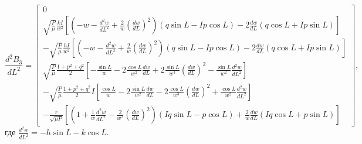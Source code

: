 \begin{equation*}
\frac{d^2 B_3}{dL^2} =
    \begin{bmatrix}
        0 \\
        \sqrt{\frac{P}{\mu}} \frac{kI}{w^2} \left[ \left( -w - \frac{d^2 w}{dL^2} +
        \frac{2}{w} \left( \frac{dw}{dL} \right)^2 \right) (q \sin L - I p \cos L) -
        2 \frac{dw}{dL} (q \cos L + Ip \sin L) \right] \\
        -\sqrt{\frac{P}{\mu}} \frac{hI}{w^2} \left[ \left( -w - \frac{d^2 w}{dL^2} +
        \frac{2}{w} \left( \frac{dw}{dL} \right)^2 \right) (q \sin L - I p \cos L) -
        2 \frac{dw}{dL} (q \cos L + Ip \sin L) \right] \\
        \sqrt{\frac{P}{\mu}} \frac{1 + p^2 + q^2}{2} \left[ -\frac{\sin L}{w} - 2 \frac{\cos L}{w^2} \frac{dw}{dL} +
        2 \frac{\sin L}{w^3} \left( \frac{dw}{dL} \right)^2 - \frac{\sin L}{w^2} \frac{d^2 w}{dL^2} \right] \\
        -\sqrt{\frac{P}{\mu}} \frac{1 + p^2 + q^2}{2} I \left[ \frac{\cos L}{w} - 2 \frac{\sin L}{w^2} \frac{dw}{dL} -
        2 \frac{\cos L}{w^3} \left( \frac{dw}{dL} \right)^2 + \frac{\cos L}{w^2} \frac{d^2 w}{dL^2} \right] \\
        -\frac{r}{\sqrt{\mu P}}  \left[ \left( 1 + \frac{1}{w} \frac{d^2 w}{dL^2} -
        \frac{2}{w^2} \left( \frac{dw}{dL} \right)^2 \right) (Iq \sin L - p \cos L) +
        \frac{2}{w} \frac{dw}{dL} (Iq \cos L + p \sin L) \right]
    \end{bmatrix},
\end{equation*}
где $ \frac{d^2 w}{dL^2} = -h \sin L - k \cos L$.
